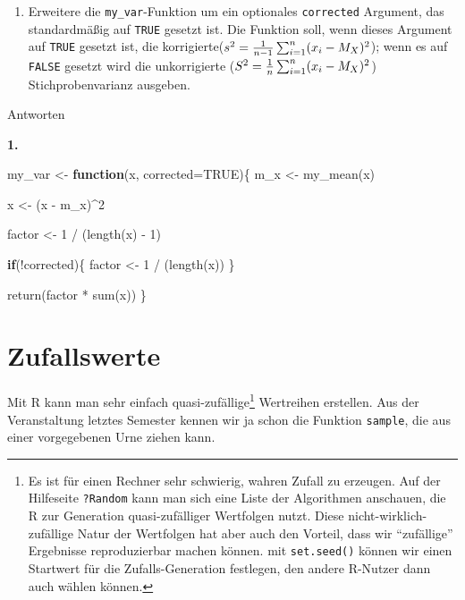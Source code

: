 \documentclass[
]{book}
\newenvironment{Shaded}{\begin{snugshade}}{\end{snugshade}}
\newcommand{\AttributeTok}[1]{\textcolor[rgb]{0.77,0.63,0.00}{#1}}
\newcommand{\ConstantTok}[1]{\textcolor[rgb]{0.00,0.00,0.00}{#1}}
\newcommand{\ControlFlowTok}[1]{\textcolor[rgb]{0.13,0.29,0.53}{\textbf{#1}}}
\newcommand{\DecValTok}[1]{\textcolor[rgb]{0.00,0.00,0.81}{#1}}
\newcommand{\FunctionTok}[1]{\textcolor[rgb]{0.00,0.00,0.00}{#1}}
\newcommand{\NormalTok}[1]{#1}
\newcommand{\OtherTok}[1]{\textcolor[rgb]{0.56,0.35,0.01}{#1}}
\newcommand{\SpecialCharTok}[1]{\textcolor[rgb]{0.00,0.00,0.00}{#1}}
\providecommand{\tightlist}{%
  \setlength{\itemsep}{0pt}\setlength{\parskip}{0pt}}
\begin{document}
\begin{enumerate}
\def\labelenumi{\arabic{enumi}.}
\tightlist
\item
  Erweitere die \texttt{my\_var}-Funktion um ein optionales \texttt{corrected} Argument, das standardmäßig auf \texttt{TRUE} gesetzt ist. Die Funktion soll, wenn dieses Argument auf \texttt{TRUE} gesetzt ist, die korrigierte(\(s^2 = {1\over{n-1}} \sum_{i=1}^n(x_i -M_X)^2\)); wenn es auf \texttt{FALSE} gesetzt wird die unkorrigierte (\(S^2 = {1\over{n}} \sum_{i=1}^n(x_i -M_X)^2\)) Stichprobenvarianz ausgeben.
\end{enumerate}

Antworten

\textbf{1.}

\begin{Shaded}
\begin{Highlighting}[]
\NormalTok{my\_var }\OtherTok{\textless{}{-}} \ControlFlowTok{function}\NormalTok{(x, }\AttributeTok{corrected=}\ConstantTok{TRUE}\NormalTok{)\{}
\NormalTok{  m\_x }\OtherTok{\textless{}{-}} \FunctionTok{my\_mean}\NormalTok{(x)}
  
\NormalTok{  x }\OtherTok{\textless{}{-}}\NormalTok{ (x }\SpecialCharTok{{-}}\NormalTok{ m\_x)}\SpecialCharTok{\^{}}\DecValTok{2}
  
\NormalTok{  factor }\OtherTok{\textless{}{-}} \DecValTok{1} \SpecialCharTok{/}\NormalTok{ (}\FunctionTok{length}\NormalTok{(x) }\SpecialCharTok{{-}} \DecValTok{1}\NormalTok{)}
  
  \ControlFlowTok{if}\NormalTok{(}\SpecialCharTok{!}\NormalTok{corrected)\{}
\NormalTok{    factor }\OtherTok{\textless{}{-}} \DecValTok{1} \SpecialCharTok{/}\NormalTok{ (}\FunctionTok{length}\NormalTok{(x))}
\NormalTok{  \}}
  
  \FunctionTok{return}\NormalTok{(factor }\SpecialCharTok{*} \FunctionTok{sum}\NormalTok{(x))}
\NormalTok{\}}
\end{Highlighting}
\end{Shaded}

\hypertarget{zufallswerte}{%
\chapter{Zufallswerte}\label{zufallswerte}}

Mit R kann man sehr einfach quasi-zufällige\footnote{Es ist für einen Rechner sehr schwierig, wahren Zufall zu erzeugen. Auf der Hilfeseite \texttt{?Random} kann man sich eine Liste der Algorithmen anschauen, die R zur Generation quasi-zufälliger Wertfolgen nutzt. Diese nicht-wirklich-zufällige Natur der Wertfolgen hat aber auch den Vorteil, dass wir ``zufällige'' Ergebnisse reproduzierbar machen können. mit \texttt{set.seed()} können wir einen Startwert für die Zufalls-Generation festlegen, den andere R-Nutzer dann auch wählen können.} Wertreihen erstellen. Aus der Veranstaltung letztes Semester kennen wir ja schon die Funktion \texttt{sample}, die aus einer vorgegebenen Urne ziehen kann.
\end{document}
